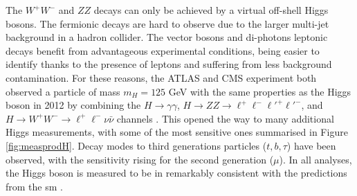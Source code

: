 The $W^+W^-$ and $ZZ$ decays can only be achieved by a virtual off-shell Higgs bosons. The fermionic decays are hard to observe due to the larger multi-jet background in a hadron collider. The vector bosons and di-photons leptonic decays benefit from advantageous experimental conditions, being easier to identify thanks to the presence of leptons and suffering from less background contamination. For these reasons, the ATLAS and CMS experiment both observed a particle of mass $m_H = 125$ GeV with the same properties as the Higgs boson in 2012 by combining the $H \rightarrow \gamma\gamma$, $H \rightarrow ZZ \rightarrow \ell^+\ell^-\ell'^+\ell'^-$, and $H \rightarrow W^+W^- \rightarrow \ell^+\ell^-\nu \bar{\nu}$ channels \cite{ATLAS:2012yve, CMS:2012qbp}. This opened the way to many additional Higgs measurements, with some of the most sensitive ones summarised in Figure \ref{fig:measprodH}. Decay modes to third generations particles ($t, b, \tau$) have been observed, with the sensitivity rising for the second generation ($\mu$). In all analyses, the Higgs boson is measured to be in remarkably consistent with the predictions from the \gls{sm} \cite{ATLAS:2022vkf}. 
